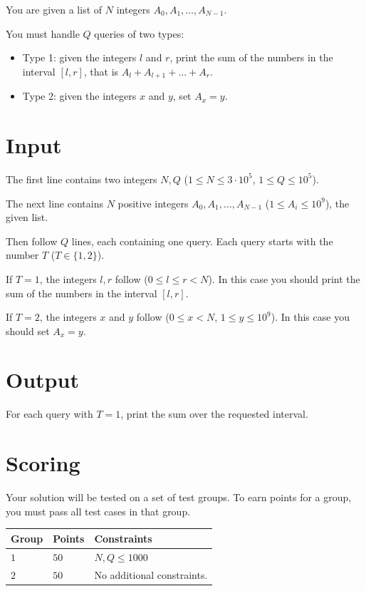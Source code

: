 You are given a list of $N$ integers $A_0, A_1, \dots, A_{N-1}$.

You must handle $Q$ queries of two types:
\begin{itemize}
  \item Type 1: given the integers $l$ and $r$, print the sum of the numbers in the interval $[l,r]$, that is $A_l + A_{l+1} + \dots + A_r$.
  \item Type 2: given the integers $x$ and $y$, set $A_x = y$.
\end{itemize}

\section*{Input}
The first line contains two integers $N, Q$ ($1 \leq N \leq 3 \cdot 10^5$, $1 \leq Q \leq 10^5$).

The next line contains $N$ positive integers $A_0, A_1, \dots, A_{N-1}$ ($1 \leq A_i \leq 10^9$),
the given list.

Then follow $Q$ lines, each containing one query. Each query starts with the number $T$ ($T \in \{1,2\}$).

If $T=1$, the integers $l, r$ follow ($0 \leq l \leq r < N$).
In this case you should print the sum of the numbers in the interval $[l,r]$.

If $T=2$, the integers $x$ and $y$ follow ($0 \leq x < N$, $1 \leq y \leq 10^9$).
In this case you should set $A_x = y$.


\section*{Output}
For each query with $T=1$, print the sum over the requested interval.

\section*{Scoring}
Your solution will be tested on a set of test groups.
To earn points for a group, you must pass all test cases in that group.

\noindent
\begin{tabular}{| l | l | p{12cm} |}
\hline
  \textbf{Group} & \textbf{Points} & \textbf{Constraints} \\ \hline
  $1$    & $50$       &  $N,Q \leq 1000$ \\ \hline
  $2$    & $50$       &  No additional constraints. \\ \hline
\end{tabular}
